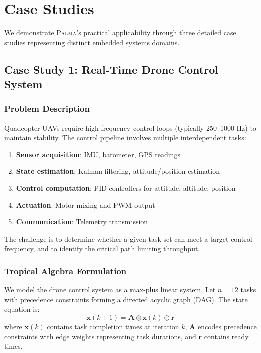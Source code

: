 \documentclass[11pt,a4paper]{article}
\theoremstyle{plain}
\theoremstyle{definition}
\newcommand{\palma}{\textsc{Palma}}
\newcommand{\mat}[1]{\mathbf{#1}}
\newcommand{\vect}[1]{\mathbf{#1}}
\begin{document}
\section{Case Studies}
\label{sec:casestudies}

We demonstrate \palma{}'s practical applicability through three detailed case studies representing distinct embedded systems domains.

\subsection{Case Study 1: Real-Time Drone Control System}

\subsubsection{Problem Description}

Quadcopter UAVs require high-frequency control loops (typically 250--1000 Hz) to maintain stability. The control pipeline involves multiple interdependent tasks:

\begin{enumerate}
    \item \textbf{Sensor acquisition}: IMU, barometer, GPS readings
    \item \textbf{State estimation}: Kalman filtering, attitude/position estimation
    \item \textbf{Control computation}: PID controllers for attitude, altitude, position
    \item \textbf{Actuation}: Motor mixing and PWM output
    \item \textbf{Communication}: Telemetry transmission
\end{enumerate}

The challenge is to determine whether a given task set can meet a target control frequency, and to identify the critical path limiting throughput.

\subsubsection{Tropical Algebra Formulation}

We model the drone control system as a max-plus linear system. Let $n = 12$ tasks with precedence constraints forming a directed acyclic graph (DAG). The state equation is:
\begin{equation}
    \vect{x}(k+1) = \mat{A} \otimes \vect{x}(k) \oplus \vect{r}
\end{equation}
where $\vect{x}(k)$ contains task completion times at iteration $k$, $\mat{A}$ encodes precedence constraints with edge weights representing task durations, and $\vect{r}$ contains ready times.
\end{document}
